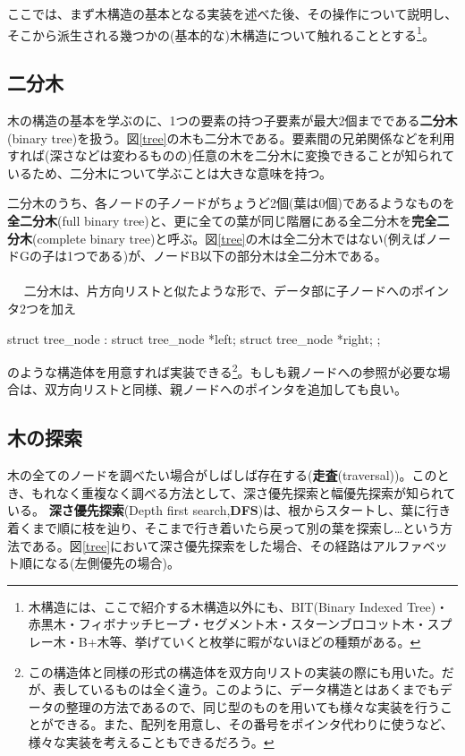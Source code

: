 ここでは、まず木構造の基本となる実装を述べた後、その操作について説明し、そこから派生される幾つかの(基本的な)木構造について触れることとする\footnote{木構造には、ここで紹介する木構造以外にも、BIT(Binary Indexed Tree)・赤黒木・フィボナッチヒープ・セグメント木・スターンブロコット木・スプレー木・B+木等、挙げていくと枚挙に暇がないほどの種類がある。}。

\subsection{二分木}
木の構造の基本を学ぶのに、1つの要素の持つ子要素が最大2個までである\textbf{二分木}(binary tree)を扱う。図\ref{tree}の木も二分木である。要素間の兄弟関係などを利用すれば(深さなどは変わるものの)任意の木を二分木に変換できることが知られているため、二分木について学ぶことは大きな意味を持つ。

二分木のうち、各ノードの子ノードがちょうど2個(葉は0個)であるようなものを\textbf{全二分木}(full binary tree)と、更に全ての葉が同じ階層にある全二分木を\textbf{完全二分木}(complete binary tree)と呼ぶ。図\ref{tree}の木は全二分木ではない(例えばノードGの子は1つである)が、ノードB以下の部分木は全二分木である。
\\ \\　
二分木は、片方向リストと似たような形で、データ部に子ノードへのポインタ2つを加え
\begin{code}
struct tree_node{
     :
  struct tree_node *left;
  struct tree_node *right;
};
\end{code}
のような構造体を用意すれば実装できる\footnote{この構造体と同様の形式の構造体を双方向リストの実装の際にも用いた。だが、表しているものは全く違う。このように、データ構造とはあくまでもデータの整理の方法であるので、同じ型のものを用いても様々な実装を行うことができる。また、配列を用意し、その番号をポインタ代わりに使うなど、様々な実装を考えることもできるだろう。}。もしも親ノードへの参照が必要な場合は、双方向リストと同様、親ノードへのポインタを追加しても良い。

\subsection{木の探索}
木の全てのノードを調べたい場合がしばしば存在する(\textbf{走査}(traversal))。このとき、もれなく重複なく調べる方法として、深さ優先探索と幅優先探索が知られている。
\textbf{深さ優先探索}(Depth first search,\textbf{DFS})は、根からスタートし、葉に行き着くまで順に枝を辿り、そこまで行き着いたら戻って別の葉を探索し…という方法である。図\ref{tree}において深さ優先探索をした場合、その経路はアルファベット順になる(左側優先の場合)。

